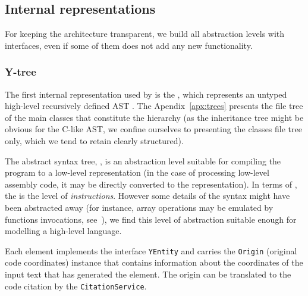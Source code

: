\subsection{Internal representations}
\label{ch:impl:model}

For keeping the architecture transparent, we build all abstraction levels with interfaces, even if some of them does not add any new functionality.

\subsubsection{Y-tree}
\label{ch:impl:model:ytree}

The first internal representation used by \porthos[2] is the \textit{\ytree{}}, which represents an untyped high-level recursively defined AST%
%
%
. The Apendix~\ref{apx:trees} presents the file tree of the main classes that constitute the \ytree{} hierarchy (as the inheritance tree might be obvious for the C-like AST, we confine ourselves to presenting the classes file tree only, which we tend to retain clearly structured).

The abstract syntax tree, \ytree{}, is an abstraction level suitable for compiling the program to a low-level representation (in the case of processing low-level assembly code, it may be directly converted to the \xgraph{} representation).
In terms of \porthos[1], the \ytree{} is the level of \textit{instructions}.
However some details of the syntax might have been abstracted away (for instance, array operations may be emulated by functions invocations, see~\cite[Chapter 5]{gries2012science}), we find this level of abstraction suitable enough for modelling a high-level language.

Each \ytree{} element implements the interface \texttt{YEntity} and carries the \texttt{Origin} (original code coordinates) instance that contains information about the coordinates of the input text that has generated the \ytree{} element.
The origin can be translated to the code citation by the \texttt{CitationService}.

